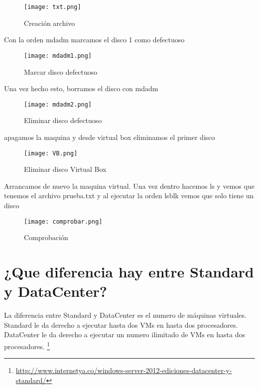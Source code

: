\begin{figure}[H] 
\centering
\texttt{[image: txt.png]}  
\label{figura4:}
\caption{Creación archivo}
\end{figure}

Con la orden mdadm marcamos el disco 1 como defectuoso

\begin{figure}[H] 
\centering
\texttt{[image: mdadm1.png]}  
\label{figura5:}
\caption{Marcar disco defectuoso}
\end{figure}

Una vez hecho esto, borramos el disco con mdadm

\begin{figure}[H] 
\centering
\texttt{[image: mdadm2.png]}  
\label{figura6:}
\caption{Eliminar disco defectuoso}
\end{figure}

apagamos la maquina y desde virtual box eliminamos el primer disco

\begin{figure}[H] 
\centering
\texttt{[image: VB.png]}  
\label{figura7:}
\caption{Eliminar disco Virtual Box}
\end{figure}

Arrancamos de nuevo la maquina virtual. Una vez dentro hacemos ls y vemos que tenemos el archivo prueba.txt y al ejecutar la orden lsblk vemos que solo tiene un disco

\begin{figure}[H] 
\centering
\texttt{[image: comprobar.png]}  
\label{figura9:}
\caption{Comprobación}
\end{figure}

\section{¿Que diferencia hay entre Standard y DataCenter?}
La diferencia entre Standard y DataCenter es el numero de máquinas virtuales. Standard le da derecho a ejecutar hasta dos VMs en hasta dos procesadores. DataCenter le da derecho a ejecutar un numero ilimitado de VMs en hasta dos procesadores. \footnote{\url{http://www.internetya.co/windows-server-2012-ediciones-datacenter-y-standard/}}
